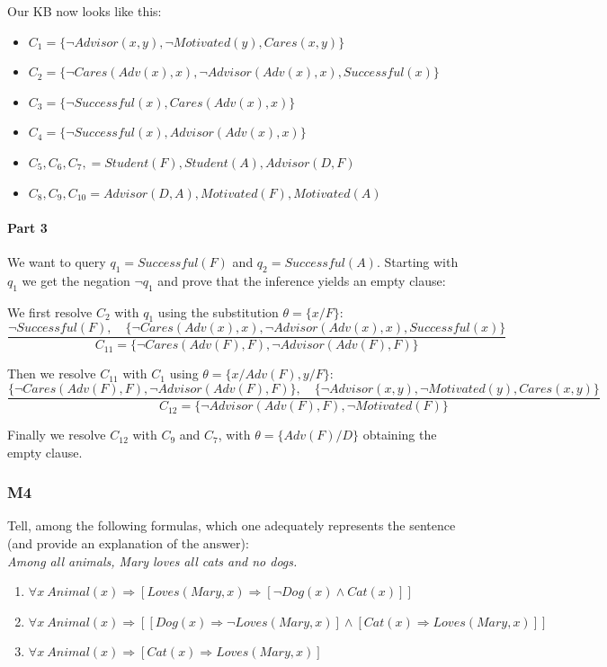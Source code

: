 \documentclass[10pt,a4paper]{article}
\begin{document}
\begin{itemize}
Our KB now looks like this:
\begin{itemize}
\item $C_1=\lbrace \neg Advisor(x,y), \neg Motivated(y), Cares(x,y)\rbrace$
\item $C_2=\lbrace  \neg Cares(Adv(x),x), \neg Advisor(Adv(x),x), Successful(x)\rbrace$
\item $C_3=\lbrace \neg Successful(x), Cares(Adv(x),x) \rbrace$
\item $C_4=\lbrace \neg Successful(x), Advisor(Adv(x),x) \rbrace$
\item $C_5,C_6,C_7,=Student(F),Student(A),Advisor(D,F)$
\item $C_8,C_9,C_{10}=Advisor(D,A), Motivated(F),Motivated(A)$
\end{itemize}

\paragraph{Part 3}
We want to query $q_1=Successful(F)$ and $q_2=Successful(A)$. Starting with $q_1$ we get the negation $\neg q_1$ and prove that the inference yields an empty clause:

We first resolve $C_2$ with $q_1$ using the substitution $\theta=\{x/F\}$:
\[\frac{\neg Successful(F),\quad \lbrace  \neg Cares(Adv(x),x), \neg Advisor(Adv(x),x), Successful(x)\rbrace}{C_{11}=\lbrace  \neg Cares(Adv(F),F), \neg Advisor(Adv(F),F)\rbrace}\]

Then we resolve $C_{11}$ with $C_1$ using $\theta=\{x/Adv(F),y/F\}$:
\[\frac{\lbrace  \neg Cares(Adv(F),F), \neg Advisor(Adv(F),F)\rbrace,\quad \lbrace \neg Advisor(x,y), \neg Motivated(y), Cares(x,y)\rbrace}{C_{12}=\lbrace \neg Advisor(Adv(F),F),\neg Motivated(F) \rbrace}\]

Finally we resolve $C_{12}$ with $C_9$ and $C_7$, with $\theta=\{Adv(F)/D\}$ obtaining the empty clause.

\subsubsection{M4}
Tell, among the following formulas, which one adequately represents the sentence (and provide an explanation of the answer):\\
\textit{Among all animals, Mary loves all cats and no dogs.}\\
\begin{enumerate}
\item $\forall x\ Animal(x)\Rightarrow[Loves(Mary,x)\Rightarrow[\neg Dog(x)\wedge Cat(x)]]$
\item $\forall x\ Animal(x)\Rightarrow[[Dog(x)\Rightarrow \neg Loves(Mary,x)]\wedge [ Cat(x)\Rightarrow Loves(Mary,x)]]$
\item $\forall x\ Animal(x)\Rightarrow[Cat(x)\Rightarrow Loves(Mary,x)]$
\end{enumerate}


\end{itemize}
\end{document}
